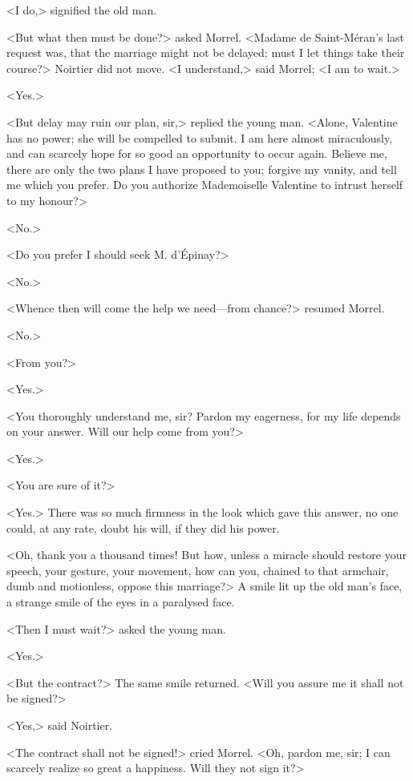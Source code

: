  <I do,> signified the old man. 

 <But what then must be done?> asked Morrel. <Madame de Saint-Méran's last request was, that the marriage might not be delayed; must I let things take their course?> Noirtier did not move. <I understand,> said Morrel; <I am to wait.> 

 <Yes.> 

 <But delay may ruin our plan, sir,> replied the young man. <Alone, Valentine has no power; she will be compelled to submit. I am here almost miraculously, and can scarcely hope for so good an opportunity to occur again. Believe me, there are only the two plans I have proposed to you; forgive my vanity, and tell me which you prefer. Do you authorize Mademoiselle Valentine to intrust herself to my honour?> 

 <No.> 

 <Do you prefer I should seek M. d'Épinay?> 

 <No.> 

 <Whence then will come the help we need—from chance?> resumed Morrel. 

 <No.> 

 <From you?> 

 <Yes.> 

 <You thoroughly understand me, sir? Pardon my eagerness, for my life depends on your answer. Will our help come from you?> 

 <Yes.> 

 <You are sure of it?> 

 <Yes.> There was so much firmness in the look which gave this answer, no one could, at any rate, doubt his will, if they did his power. 

 <Oh, thank you a thousand times! But how, unless a miracle should restore your speech, your gesture, your movement, how can you, chained to that armchair, dumb and motionless, oppose this marriage?> A smile lit up the old man's face, a strange smile of the eyes in a paralysed face. 

 <Then I must wait?> asked the young man. 

 <Yes.> 

 <But the contract?> The same smile returned. <Will you assure me it shall not be signed?> 

 <Yes,> said Noirtier. 

 <The contract shall not be signed!> cried Morrel. <Oh, pardon me, sir; I can scarcely realize so great a happiness. Will they not sign it?> 

